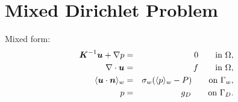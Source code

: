 

\usepackage{enumitem}




\section{Mixed Dirichlet Problem}

Mixed form:
\begin{eqnarray}
    \mathbf{\boldsymbol{K}}^{-1} \mathbf{\boldsymbol{u}} + \nabla p &=& 0 \qquad \textrm{in } \Omega, \label{eqn:mixed_form_1}\\
    \nabla \cdot \mathbf{\boldsymbol{u}} &=& f \qquad \textrm{in } \Omega, \label{eqn:mixed_form_2}\\
    \langle\mathbf{\boldsymbol{u}} \cdot \mathbf{\boldsymbol{n}}\rangle_w &=& \sigma_w (\langle p\rangle_w - P) \qquad \textrm{on } \Gamma_w, \label{eqn:mixed_form_3}\\
    p &=& g_{D} \qquad \textrm{on } \Gamma_{D} \label{eqn:mixed_form_4}.
\end{eqnarray}
  
